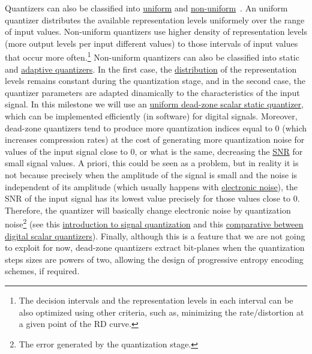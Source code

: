 Quantizers can also be classified into
\href{https://en.wikipedia.org/wiki/Quantization_(signal_processing)#Mid-riser_and_mid-tread_uniform_quantizers}{uniform}
and
\href{https://nptel.ac.in/content/storage2/courses/117104069/chapter_5/5_5.html}{non-uniform}~\cite{sayood2017introduction,vetterli2014foundations}. An
uniform quantizer distributes the available representation levels
uniformely over the range of input values. Non-uniform quantizers use
higher density of representation levels (more output levels per input
different values) to those intervals of input values that occur more
often.\footnote{The decision intervals and the representation levels
in each interval can be also optimized using other criteria, such as,
minimizing the rate/distortion at a given point of the RD curve.}
Non-uniform quantizers can also be classified into static and
\href{https://en.wikipedia.org/wiki/Adaptive_differential_pulse-code_modulation}{adaptive
  quantizers}. In the first case, the
\href{https://en.wikipedia.org/wiki/Probability_distribution}{distribution}
of the representation levels remains constant during the quantization
stage, and in the second case, the quantizer parameters are adapted
dinamically to the characteristics of the input signal. In this
milestone we will use an
\href{https://en.wikipedia.org/wiki/Quantization_(signal_processing)#Dead-zone_quantizers}{uniform
  dead-zone scalar static quantizer}, which can be implemented
efficiently (in software) for digital signals. Moreover, dead-zone
quantizers tend to produce more quantization indices equal to 0 (which
increases compression rates) at the cost of generating more
quantization noise for values of the input signal close to 0, or what
is the same, decreasing the
\href{https://en.wikipedia.org/wiki/Signal-to-noise_ratio}{SNR} for
small signal values. A priori, this could be seen as a problem, but in
reality it is not because precisely when the amplitude of the signal
is small and the noise is independent of its amplitude (which usually
happens with
\href{https://en.wikipedia.org/wiki/Noise_(electronics)}{electronic
  noise}), the SNR of the input signal has its lowest value precisely
for those values close to 0. Therefore, the quantizer will basically change electronic noise by quantization
noise\footnote{The error generated by the quantization stage.} (see
this
\href{https://github.com/vicente-gonzalez-ruiz/signal_quantization}{introduction
  to signal quantization} and this
\href{https://github.com/vicente-gonzalez-ruiz/scalar_quantization}{comparative
  between digital scalar quantizers}). Finally, although this is a
feature that we are not going to exploit for now, dead-zone quantizers
extract bit-planes when the quantization steps sizes are powers of
two, allowing the design of progressive entropy encoding schemes, if
required.

